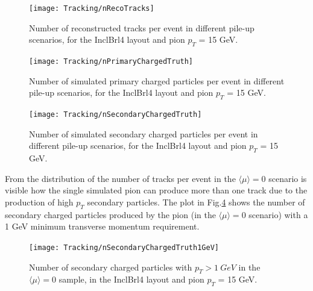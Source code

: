 \documentclass[a4paper,twoside,12pt]{book}
\begin{document}
\begin{figure}
\centering
\texttt{[image: Tracking/nRecoTracks]}
\caption{Number of reconstructed tracks per event in different pile-up scenarios, for the InclBrl4 layout and pion $p_{T}$ = 15 GeV.}
\label{fig:tracking:nRecoTracks}
\end{figure}

\begin{figure}
\centering
\texttt{[image: Tracking/nPrimaryChargedTruth]}
\caption{Number of simulated primary charged particles per event in different pile-up scenarios, for the InclBrl4 layout and pion $p_{T}$ = 15 GeV.}
\label{fig:tracking:nPrimaryChargedTruth}
\end{figure}

\begin{figure}
\centering
\texttt{[image: Tracking/nSecondaryChargedTruth]}
\caption{Number of simulated secondary charged particles per event in different pile-up scenarios, for the InclBrl4 layout and pion $p_{T}$ = 15 GeV.}
\label{fig:tracking:nSecondaryChargedTruth}
\end{figure}

From the distribution of the number of tracks per event in the $\langle\mu\rangle = 0$ scenario is visible
how the single simulated pion can produce more than one track due to the production of high $p_{T}$ secondary particles. The plot in Fig.\ref{fig:tracking:nSecondaryChargedTruth1GeV} shows the number of secondary charged particles produced by the pion (in the $\langle\mu\rangle = 0$ scenario)
with a 1 GeV minimum transverse momentum requirement. \\

\begin{figure}
\centering
\texttt{[image: Tracking/nSecondaryChargedTruth1GeV]}
\caption{Number of secondary charged particles with $p_T > 1\ GeV$ in the \mbox{$\langle\mu\rangle = 0$} sample, in the InclBrl4 layout and pion $p_{T}$ = 15 GeV.}
\label{fig:tracking:nSecondaryChargedTruth1GeV}
\end{figure}
\end{document}
